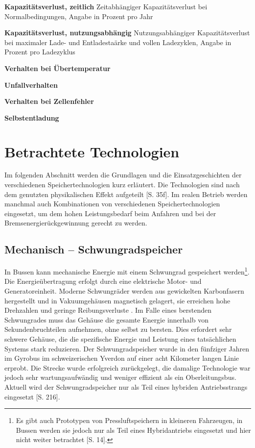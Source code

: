 \begin{itemize}
\begin{description}
		\item \textbf{Kapazitätsverlust, zeitlich}
		Zeitabhängiger Kapazitätsverlust bei Normalbedingungen, Angabe in Prozent pro Jahr%
		\item \textbf{Kapazitätsverlust, nutzungsabhängig}
		Nutzungsabhängiger Kapazitätsverlust bei maximaler Lade- und Entladestaärke und vollen Ladezyklen, Angabe in Prozent pro Ladezyklus %
		\item \textbf{Verhalten bei Übertemperatur}
		\item \textbf{Unfallverhalten}
		\item \textbf{Verhalten bei Zellenfehler}
		\item \textbf{Selbstentladung}
	\end{description}
\end{itemize}

\section{Betrachtete Technologien}
Im folgenden Abschnitt werden die Grundlagen und die Einsatzgeschichten der verschiedenen Speichertechnologien kurz erläutert. Die Technologien sind nach dem genutzten physikalischen Effekt aufgeteilt \cite{Sterner:2014}[S. 35f]. Im realen Betrieb werden manchmal auch Kombinationen von verschiedenen Speichertechnologien eingesetzt, um dem hohen Leistungsbedarf beim Anfahren und bei der Bremsenergierückgewinnung gerecht zu werden.

\subsection{Mechanisch – Schwungradspeicher} %
In Bussen kann mechanische Energie mit einem Schwungrad gespeichert werden\footnote{Es gibt auch Prototypen von Pressluftspeichern in kleineren Fahrzeugen, in Bussen werden sie jedoch nur als Teil eines Hybridantriebs eingesetzt und hier nicht weiter betrachtet \cite{Sebastian-Naumann:2014}[S. 14].}. Die Energieübertragung erfolgt durch eine elektrische Motor- und Generatoreinheit. Moderne Schwungräder werden aus gewickelten Karbonfasern hergestellt und in Vakuumgehäusen magnetisch gelagert, sie erreichen hohe Drehzahlen und geringe Reibungsverluste \cite{993788}. Im Falle eines berstenden Schwungrades muss das Gehäuse die gesamte Energie innerhalb von Sekundenbruchteilen aufnehmen, ohne selbst zu bersten. Dies erfordert sehr schwere Gehäuse, die die spezifische Energie und Leistung eines tatsächlichen Systems stark reduzieren. Der Schwungradspeicher wurde in den fünfziger Jahren im Gyrobus im schweizerischen Yverdon auf einer acht Kilometer langen Linie erprobt. Die Strecke wurde erfolgreich zurückgelegt, die damalige Technologie war jedoch sehr wartungsaufwändig und weniger effizient als ein Oberleitungsbus. Aktuell wird der Schwungradspeicher nur als Teil eines hybriden Antriebsstrangs eingesetzt \cite{tub_aleph001746639}[S. 216].

